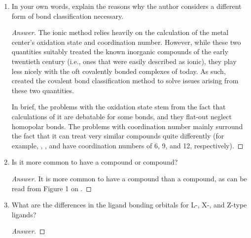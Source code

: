 \documentclass[../psets.tex]{subfiles}
\begin{document}
\begin{enumerate}
\begin{enumerate}[label={\alph*)}]
        \item In your own words, explain the reasons why the author considers a different form of bond classification necessary.
        \begin{proof}[Answer]

            The ionic method relies heavily on the calculation of the metal center's oxidation state and coordination number. However, while these two quantities suitably treated the known inorganic compounds of the early twentieth century (i.e., ones that were easily described as ionic), they play less nicely with the oft covalently bonded complexes of today. As such, \textcite{bib:CBC} created the covalent bond classification method to solve issues arising from these two quantities.\par
            In brief, the problems with the oxidation state stem from the fact that calculations of it are debatable for some bonds, and they flat-out neglect homopolar bonds. The problems with coordination number mainly surround the fact that it can treat very similar compounds quite differently (for example, , , and  have coordination numbers of 6, 9, and 12, respectively).
        \end{proof}
        \item Is it more common to have a  compound or  compound?
        \begin{proof}[Answer]
            It is more common to have a  compound than a  compound, as can be read from Figure 1 on \textcite[128]{bib:CBC}.
        \end{proof}
        \item What are the differences in the ligand bonding orbitals for L-, X-, and Z-type ligands?
        \begin{proof}[Answer]


\end{proof}
\end{enumerate}
\end{enumerate}
\end{document}
